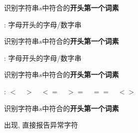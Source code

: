 \begin{frame}{}
  \begin{center}
    识别字符串$s$中符合的{\bf 开头第一个词素}

    \vspace{0.50cm}
    \id: 字母开头的字母/数字串

    \pause
    \vspace{0.20cm}

  \end{center}
\end{frame}

\begin{frame}{}
  \begin{center}
    识别字符串$s$中符合的{\bf 开头第一个词素}

    \vspace{0.60cm}
    \id: 字母开头的字母/数字串

    \vspace{0.60cm}
  \end{center}
\end{frame}

\begin{frame}{}
  \begin{center}
    识别字符串$s$中符合的{\bf 开头第一个词素}

    \vspace{0.60cm}
    \relop: $< \quad > \quad <= \quad >= \quad == \quad <>$

    \vspace{0.60cm}
  \end{center}
\end{frame}

\begin{frame}{}
  \begin{center}
    识别字符串$s$中符合的{\bf 开头第一个词素}

    \vspace{0.60cm}

    \vspace{0.50cm}
    出现, 直接报告异常字符
  \end{center}
\end{frame}

